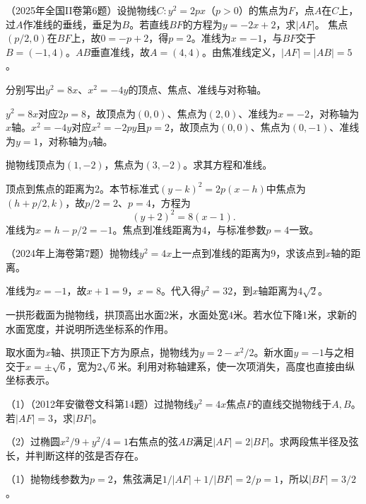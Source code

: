 （2025年全国II卷第6题）设抛物线\(C:y^2=2px\)（\(p>0\)）的焦点为\(F\)，点\(A\)在\(C\)上，过\(A\)作准线的垂线，垂足为\(B\)。若直线\(BF\)的方程为\(y=-2x+2\)，求\(|AF|\)。
\solutionanswer
焦点\((p/2,0)\)在\(BF\)上，故\(0=-p+2\)，得\(p=2\)。准线为\(x=-1\)，与\(BF\)交于\(B=(-1,4)\)。\(AB\)垂直准线，故\(A=(4,4)\)。由焦准线定义，\(|AF|=|AB|=5\)。


分别写出\(y^2=8x\)、\(x^2=-4y\)的顶点、焦点、准线与对称轴。
\par
\solutionanswer
\(y^2=8x\)对应\(2p=8\)，故顶点为\((0,0)\)、焦点为\((2,0)\)、准线为\(x=-2\)，对称轴为\(x\)轴。\(x^2=-4y\)对应\(x^2=-2py\)且\(p=2\)，故顶点为\((0,0)\)、焦点为\((0,-1)\)、准线为\(y=1\)，对称轴为\(y\)轴。


抛物线顶点为\((1,-2)\)，焦点为\((3,-2)\)。求其方程和准线。
\par
\solutionanswer
顶点到焦点的距离为\(2\)。本节标准式\((y-k)^2=2p(x-h)\)中焦点为\((h+p/2,k)\)，故\(p/2=2\)、\(p=4\)，方程为
\[
(y+2)^2=8(x-1).
\]
准线为\(x=h-p/2=-1\)。焦点到准线距离为\(4\)，与标准参数\(p=4\)一致。


（2024年上海卷第7题）抛物线\(y^2=4x\)上一点到准线的距离为\(9\)，求该点到\(x\)轴的距离。
\par
\solutionanswer
准线为\(x=-1\)，故\(x+1=9\)，\(x=8\)。代入得\(y^2=32\)，到\(x\)轴距离为\(4\sqrt2\)。


一拱形截面为抛物线，拱顶高出水面\(2\)米，水面处宽\(4\)米。若水位下降\(1\)米，求新的水面宽度，并说明所选坐标系的作用。
\par
\solutionanswer
取水面为\(x\)轴、拱顶正下方为原点，抛物线为\(y=2-x^2/2\)。新水面\(y=-1\)与之相交于\(x=\pm\sqrt6\)，宽为\(2\sqrt6\)米。利用对称轴建系，使一次项消失，高度也直接由纵坐标表示。


（1）（2012年安徽卷文科第14题）过抛物线\(y^2=4x\)焦点\(F\)的直线交抛物线于\(A,B\)。若\(|AF|=3\)，求\(|BF|\)。
\par



（2）过椭圆\(x^2/9+y^2/4=1\)右焦点的弦\(AB\)满足\(|AF|=2|BF|\)。求两段焦半径及弦长，并判断这样的弦是否存在。
\par
\solutionanswer
（1）抛物线参数为\(p=2\)，焦弦满足\(1/|AF|+1/|BF|=2/p=1\)，所以\(|BF|=3/2\)。

